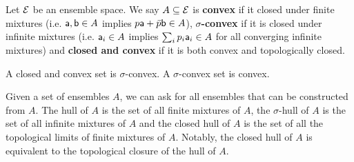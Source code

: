 \begin{mathSection}
\begin{defn}
	Let $\Ens$ be an ensemble space. We say $A \subseteq \Ens$ is \textbf{convex} if it closed under finite mixtures (i.e. $\ens[a],\ens[b] \in A$ implies $p\ens[a] + \bar{p} \ens[b] \in A$), \textbf{$\sigma$-convex} if it is closed under infinite mixtures (i.e. $\ens[a]_i \in A$ implies $\sum_i p_i \ens[a]_i \in A$ for all converging infinite mixtures) and \textbf{closed and convex} if it is both convex and topologically closed.
\end{defn}

\begin{coro}
	A closed and convex set is $\sigma$-convex. A $\sigma$-convex set is convex.
\end{coro}
\end{mathSection}

Given a set of ensembles $A$, we can ask for all ensembles that can be constructed from $A$. The hull of $A$ is the set of all finite mixtures of $A$, the $\sigma$-hull of $A$ is the set of all infinite mixtures of $A$ and the closed hull of $A$ is the set of all the topological limits of finite mixtures of $A$. Notably, the closed hull of $A$ is equivalent to the topological closure of the hull of $A$.

